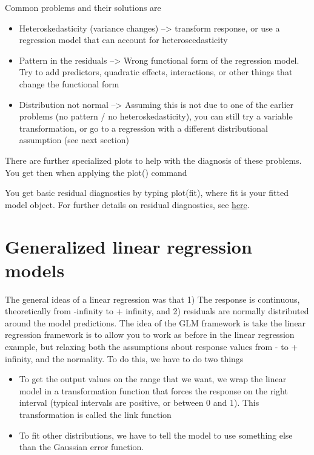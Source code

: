 \documentclass[a4paper,twoside]{tufte-book}\usepackage[]{graphicx}\usepackage[]{color}
\begin{document}
Common problems and their solutions are 

\begin{itemize}
  \item Heteroskedasticity (variance changes) --> transform response, or use a regression model that can account for heteroscedasticity
  \item Pattern in the residuals --> Wrong functional form of the regression model. Try to add predictors, quadratic effects, interactions, or other things that change the functional form
  \item Distribution not normal --> Assuming this is not due to one of the earlier problems (no pattern / no heteroskedasticity), you can still try a variable transformation, or go to a regression with a different distributional assumption (see next section)
\end{itemize}  

There are further specialized plots to help with the diagnosis of these problems. You get then when applying the plot() command 


You get basic residual diagnostics by typing plot(fit), where fit is your fitted model object. For further details on residual diagnostics, see \href{http://www.statmethods.net/stats/rdiagnostics.html}{here}.



\section{Generalized linear regression models}

The general ideas of a linear regression was that 1) The response is continuous, theoretically from -infinity to + infinity, and 2) residuals are normally distributed around the model predictions. The idea of the GLM framework is take the linear regression framework is to allow you to work as before in the linear regression example, but relaxing both the assumptions about response values from - to + infinity, and the normality. To do this, we have to do two things

\begin{itemize}
  \item To get the output values on the range that we want, we wrap the linear model in a transformation function that forces the response on the right interval (typical intervals are positive, or between 0 and 1). This transformation is called the link function
  \item To fit other distributions, we have to tell the model to use something else than the Gaussian error function. 
\end{itemize}    
   
\end{document}
